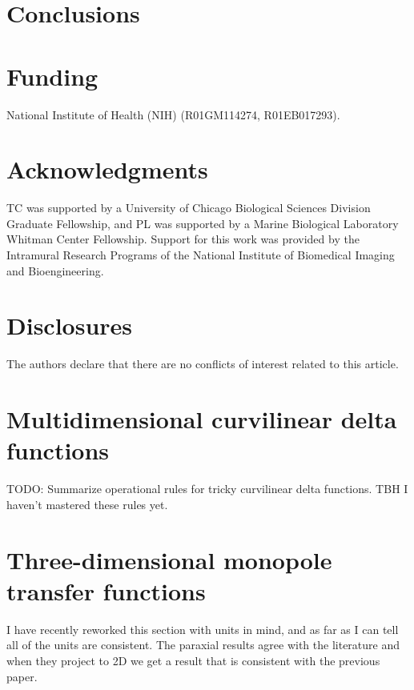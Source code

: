 \documentclass[]{osa-article}
\providecommand{\mb}[1]{\mathbf{#1}}
\providecommand{\add}[1]{{\color{blue}#1}}
\begin{document}
\section{Conclusions}

\section*{Funding}
National Institute of Health (NIH) (R01GM114274, R01EB017293).

\section*{Acknowledgments}
TC was supported by a University of Chicago Biological Sciences Division Graduate Fellowship, and PL was supported by a Marine Biological Laboratory Whitman Center Fellowship. Support for this work was provided by the Intramural Research Programs of the National Institute of Biomedical Imaging and Bioengineering. 

\section*{Disclosures}
The authors declare that there are no conflicts of interest related to this article.


\appendix

\section{Multidimensional curvilinear delta functions}

\add{TODO: Summarize operational rules for tricky curvilinear delta functions. TBH I haven't mastered these rules yet.}




\section{Three-dimensional monopole transfer functions}\label{sec:monoauto}
\add{I have recently reworked this section with units in mind, and as far as I can tell all of the units are consistent. The paraxial results agree with the literature and when they project to 2D we get a result that is consistent with the previous paper.}
\end{document}
